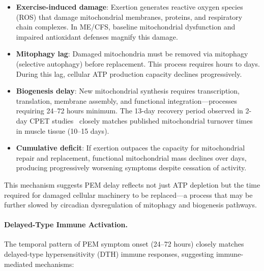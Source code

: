 \begin{itemize}
    \item \textbf{Exercise-induced damage}: Exertion generates reactive oxygen species (ROS) that damage mitochondrial membranes, proteins, and respiratory chain complexes. In ME/CFS, baseline mitochondrial dysfunction and impaired antioxidant defenses magnify this damage.
    \item \textbf{Mitophagy lag}: Damaged mitochondria must be removed via mitophagy (selective autophagy) before replacement. This process requires hours to days. During this lag, cellular ATP production capacity declines progressively.
    \item \textbf{Biogenesis delay}: New mitochondrial synthesis requires transcription, translation, membrane assembly, and functional integration---processes requiring 24--72 hours minimum. The 13-day recovery period observed in 2-day CPET studies~\cite{keller2024cpet} closely matches published mitochondrial turnover times in muscle tissue (10--15 days).
    \item \textbf{Cumulative deficit}: If exertion outpaces the capacity for mitochondrial repair and replacement, functional mitochondrial mass declines over days, producing progressively worsening symptoms despite cessation of activity.
\end{itemize}

This mechanism suggests PEM delay reflects not just ATP depletion but the time required for damaged cellular machinery to be replaced---a process that may be further slowed by circadian dysregulation of mitophagy and biogenesis pathways.

\paragraph{Delayed-Type Immune Activation.}

The temporal pattern of PEM symptom onset (24--72 hours) closely matches delayed-type hypersensitivity (DTH) immune responses, suggesting immune-mediated mechanisms:

